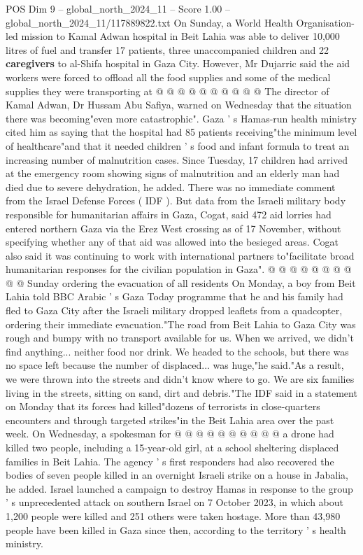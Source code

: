 \begin{textsample}{POS Dim 9 – global\_north\_2024\_11 – Score 1.00 – global\_north\_2024\_11/117889822.txt}
On Sunday, a World Health Organisation-led mission to Kamal Adwan hospital in Beit Lahia was able to deliver 10,000 litres of fuel and transfer 17 patients, three unaccompanied children and 22 \textbf{caregivers} to al-Shifa hospital in Gaza City.
However, Mr Dujarric said the aid workers were forced to offload all the food supplies and some of the medical supplies they were transporting at @ @ @ @ @ @ @ @ @ @ The director of Kamal Adwan, Dr Hussam Abu Safiya, warned on Wednesday that the situation there was becoming"even more catastrophic".
Gaza ' s Hamas-run health ministry cited him as saying that the hospital had 85 patients receiving"the minimum level of healthcare"and that it needed children ' s food and infant formula to treat an increasing number of malnutrition cases.
Since Tuesday, 17 children had arrived at the emergency room showing signs of malnutrition and an elderly man had died due to severe dehydration, he added.
There was no immediate comment from the Israel Defense Forces ( IDF ).
But data from the Israeli military body responsible for humanitarian affairs in Gaza, Cogat, said 472 aid lorries had entered northern Gaza via the Erez West crossing as of 17 November, without specifying whether any of that aid was allowed into the besieged areas.
Cogat also said it was continuing to work with international partners to"facilitate broad humanitarian responses for the civilian population in Gaza". @ @ @ @ @ @ @ @ @ @ Sunday ordering the evacuation of all residents On Monday, a boy from Beit Lahia told BBC Arabic ' s Gaza Today programme that he and his family had fled to Gaza City after the Israeli military dropped leaflets from a quadcopter, ordering their immediate evacuation."The road from Beit Lahia to Gaza City was rough and bumpy with no transport available for us.
When we arrived, we didn't find anything... neither food nor drink.
We headed to the schools, but there was no space left because the number of displaced... was huge,"he said."As a result, we were thrown into the streets and didn't know where to go.
We are six families living in the streets, sitting on sand, dirt and debris."The IDF said in a statement on Monday that its forces had killed"dozens of terrorists in close-quarters encounters and through targeted strikes"in the Beit Lahia area over the past week.
On Wednesday, a spokesman for @ @ @ @ @ @ @ @ @ @ a drone had killed two people, including a 15-year-old girl, at a school sheltering displaced families in Beit Lahia.
The agency ' s first responders had also recovered the bodies of seven people killed in an overnight Israeli strike on a house in Jabalia, he added.
Israel launched a campaign to destroy Hamas in response to the group ' s unprecedented attack on southern Israel on 7 October 2023, in which about 1,200 people were killed and 251 others were taken hostage.
More than 43,980 people have been killed in Gaza since then, according to the territory ' s health ministry.

\end{textsample}
